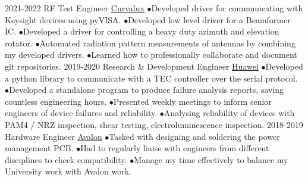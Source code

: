 \documentclass[9pt]{developercv} %
\begin{document}
\begin{entrylist}
	\entry
		{2021-2022}
		{RF Test Engineer}
		{\href{https://Curvalux.com}{Curvalux}}
		{
			$\bullet$\hspace*{0.5cm}Developed driver for communicating with Keysight devices using pyVISA.\newline
			$\bullet$\hspace*{0.5cm}Developed low level driver for a Beamformer IC.\newline
			$\bullet$\hspace*{0.5cm}Developed a driver for controlling a heavy duty azimuth and elevation rotator.\newline
			$\bullet$\hspace*{0.5cm}Automated radiation pattern measurements of antennas by combining my developed drivers.\newline
			$\bullet$\hspace*{0.5cm}Learned how to professionally collaborate and document git repositories.
		}
	\entry
		{2019-2020}
		{Research \& Development Engineer}
		{\href{https://www.huawei.com/uk/contact-us}{Huawei}}
		{
			$\bullet$\hspace*{0.5cm}Developed a python library to communicate with a TEC controller over the serial protocol.\newline
			$\bullet$\hspace*{0.5cm}Developed a standalone program to produce failure analysis reports, saving countless engineering hours.\newline
			$\bullet$\hspace*{0.5cm}Presented weekly meetings to inform senior engineers of device failures and reliability.\newline
			$\bullet$\hspace*{0.5cm}Analysing reliability of devices with PAM4 / NRZ inspection, shear testing, electroluminescence inspection.
		}
		\entry
		{2018-2019}
		{Hardware Engineer}
		{\href{https://avalonrov.wixsite.com/avalonrov}{Avalon}}
		{
			$\bullet$\hspace*{0.5cm}Tasked with designing and soldering the power management PCB.\newline
			$\bullet$\hspace*{0.5cm}Had to regularly liaise with engineers from different disciplines to check compatibility.\newline
			$\bullet$\hspace*{0.5cm}Manage my time effectively to balance my University work with Avalon work.
		}
		\entry

\end{entrylist}
\end{document}
